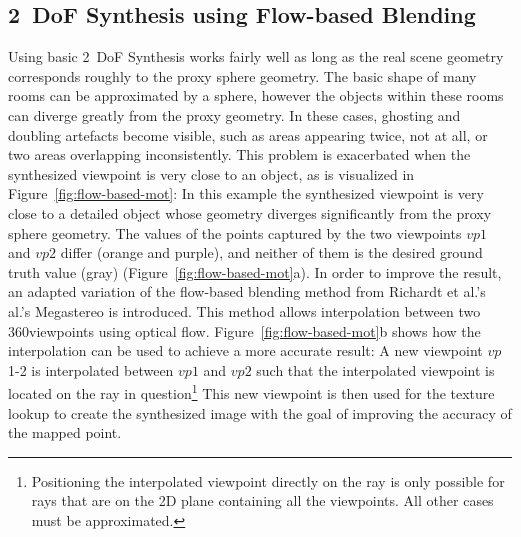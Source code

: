 
\subsection{2~DoF Synthesis using Flow-based Blending}
Using basic 2~DoF Synthesis works fairly well as long as the real scene geometry corresponds roughly to the proxy sphere geometry. The basic shape of many rooms can be approximated by a sphere, however the objects within these rooms can diverge greatly from the proxy geometry. In these cases, ghosting and doubling artefacts become visible, such as areas appearing twice, not at all, or two areas overlapping inconsistently. This problem is exacerbated when the synthesized viewpoint is very close to an object, as is visualized in Figure~\ref{fig:flow-based-mot}: In this example the synthesized viewpoint is very close to a detailed object whose geometry diverges significantly from the proxy sphere geometry. The values of the points captured by the two viewpoints $vp1$ and $vp2$ differ (orange and purple), and neither of them is the desired ground truth value (gray) (Figure~\ref{fig:flow-based-mot}a). In order to improve the result, an adapted variation of the flow-based blending method from Richardt et al.'s al.'s Megastereo \cite{megastereo} is introduced. This method allows interpolation between two 360\degree viewpoints using optical flow. Figure~\ref{fig:flow-based-mot}b shows how the interpolation can be used to achieve a more accurate result: A new viewpoint $vp$1-2 is interpolated between $vp1$ and $vp2$ such that the interpolated viewpoint is located on the ray in question\footnote{Positioning the interpolated viewpoint directly on the ray is only possible for rays that are on the 2D plane containing all the viewpoints. All other cases must be approximated.} This new viewpoint is then used for the texture lookup to create the synthesized image with the goal of improving the accuracy of the mapped point.

